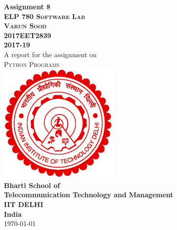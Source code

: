 \documentclass[12pt]{article}
\begin{document}
\begin{titlepage}

\center %
 


{ \Large \textbf {Assignment 8}}\\[1.0cm] %


\textsc{\LARGE \textbf{ELP 780 Software Lab}\\[1.0cm]} %
\textsc{\Large \textbf{Varun Sood}  }\\[.5cm] %
\textsc{\Large \textbf{2017EET2839}  }\\[0.5cm] %
\textsc{\Large \textbf{2017-19}  }\\[1.5cm] %
\textmd{\large {A report for the assignment on}  }\\[0.5cm] %
\textsc{\large Python Programs }\\[3cm] %



\includegraphics[scale=.5]{logo.png}\\[1cm] 

\Large\textbf{{Bharti School of}}\\
\Large\textbf{{Telecommunication Technology and Management}}\\
\Large\textbf{{IIT DELHI}}\\
\Large\textbf{{India}}\\




{\large \today}\\[3cm] %

\end{titlepage}
  
\end{document}
